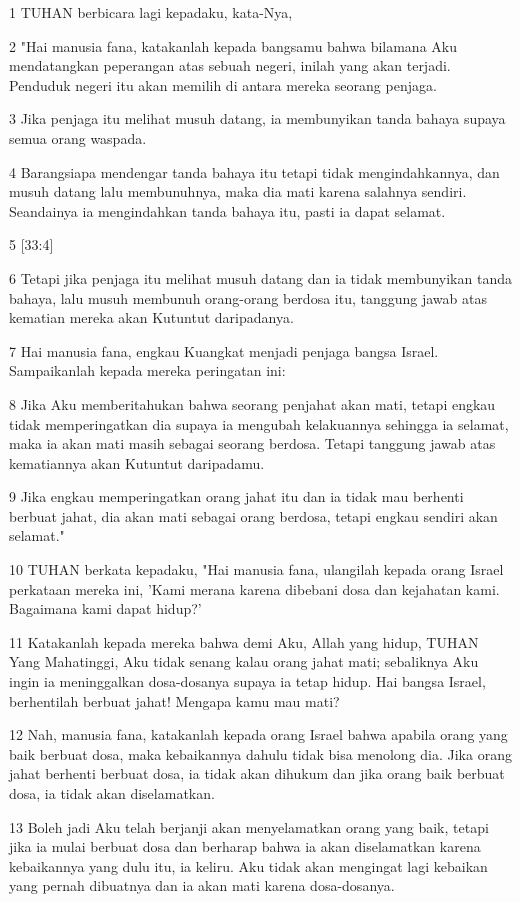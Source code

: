 \par 1 TUHAN berbicara lagi kepadaku, kata-Nya,
\par 2 "Hai manusia fana, katakanlah kepada bangsamu bahwa bilamana Aku mendatangkan peperangan atas sebuah negeri, inilah yang akan terjadi. Penduduk negeri itu akan memilih di antara mereka seorang penjaga.
\par 3 Jika penjaga itu melihat musuh datang, ia membunyikan tanda bahaya supaya semua orang waspada.
\par 4 Barangsiapa mendengar tanda bahaya itu tetapi tidak mengindahkannya, dan musuh datang lalu membunuhnya, maka dia mati karena salahnya sendiri. Seandainya ia mengindahkan tanda bahaya itu, pasti ia dapat selamat.
\par 5 [33:4]
\par 6 Tetapi jika penjaga itu melihat musuh datang dan ia tidak membunyikan tanda bahaya, lalu musuh membunuh orang-orang berdosa itu, tanggung jawab atas kematian mereka akan Kutuntut daripadanya.
\par 7 Hai manusia fana, engkau Kuangkat menjadi penjaga bangsa Israel. Sampaikanlah kepada mereka peringatan ini:
\par 8 Jika Aku memberitahukan bahwa seorang penjahat akan mati, tetapi engkau tidak memperingatkan dia supaya ia mengubah kelakuannya sehingga ia selamat, maka ia akan mati masih sebagai seorang berdosa. Tetapi tanggung jawab atas kematiannya akan Kutuntut daripadamu.
\par 9 Jika engkau memperingatkan orang jahat itu dan ia tidak mau berhenti berbuat jahat, dia akan mati sebagai orang berdosa, tetapi engkau sendiri akan selamat."
\par 10 TUHAN berkata kepadaku, "Hai manusia fana, ulangilah kepada orang Israel perkataan mereka ini, 'Kami merana karena dibebani dosa dan kejahatan kami. Bagaimana kami dapat hidup?'
\par 11 Katakanlah kepada mereka bahwa demi Aku, Allah yang hidup, TUHAN Yang Mahatinggi, Aku tidak senang kalau orang jahat mati; sebaliknya Aku ingin ia meninggalkan dosa-dosanya supaya ia tetap hidup. Hai bangsa Israel, berhentilah berbuat jahat! Mengapa kamu mau mati?
\par 12 Nah, manusia fana, katakanlah kepada orang Israel bahwa apabila orang yang baik berbuat dosa, maka kebaikannya dahulu tidak bisa menolong dia. Jika orang jahat berhenti berbuat dosa, ia tidak akan dihukum dan jika orang baik berbuat dosa, ia tidak akan diselamatkan.
\par 13 Boleh jadi Aku telah berjanji akan menyelamatkan orang yang baik, tetapi jika ia mulai berbuat dosa dan berharap bahwa ia akan diselamatkan karena kebaikannya yang dulu itu, ia keliru. Aku tidak akan mengingat lagi kebaikan yang pernah dibuatnya dan ia akan mati karena dosa-dosanya.
